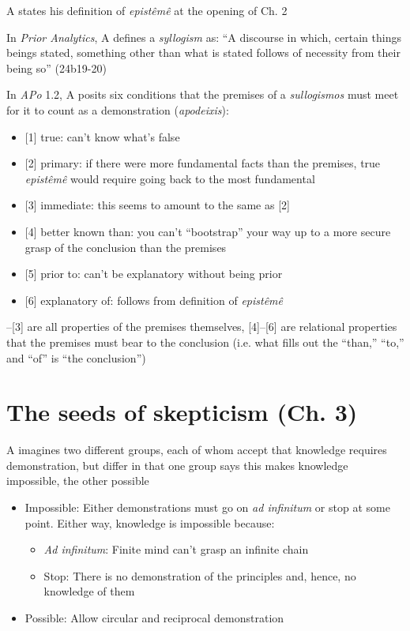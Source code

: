 \documentclass[oneside]{article}
\begin{document}
\noindent A states his definition of \emph{epist\^{e}m\^{e}} at the opening of Ch. 2
\vspace*{2mm}

\noindent In \emph{Prior Analytics}, A defines a \emph{syllogism} as: ``A discourse in which, certain things beings stated, something other than what is stated follows of necessity from their being so'' (24b19-20)
\vspace*{2mm}

\noindent In \emph{APo} 1.2, A posits six conditions that the premises of a \emph{sullogismos} must meet for it to count as a demonstration (\emph{apodeixis}):

\begin{itemize}\item{[1] true: can't know what's false}\item{[2] primary: if there were more fundamental facts than the premises, true \emph{epist\^{e}m\^{e}} would require going back to the most fundamental}\item{[3] immediate: this seems to amount to the same as [2]}\item{[4] better known than: you can't ``bootstrap'' your way up to a more secure grasp of the conclusion than the premises}\item{[5] prior to: can't be explanatory without being prior}\item{[6] explanatory of: follows from definition of \emph{epist\^{e}m\^{e}}}\end{itemize}

\noindent [1]--[3] are all properties of the premises themselves, [4]--[6] are relational properties that the premises must bear to the conclusion (i.e. what fills out the ``than,'' ``to,'' and ``of'' is ``the conclusion'')
\vspace*{2mm}

\section*{The seeds of skepticism (Ch. 3)}

\noindent A imagines two different groups, each of whom accept that knowledge requires demonstration, but differ in that one group says this makes knowledge impossible, the other possible

\begin{itemize}\item{Impossible: Either demonstrations must go on \emph{ad infinitum} or stop at some point. Either way, knowledge is impossible because:}\begin{itemize}\item{\emph{Ad infinitum}: Finite mind can't grasp an infinite chain}\item{Stop: There is no demonstration of the principles and, hence, no knowledge of them}\end{itemize}\item{Possible: Allow circular and reciprocal demonstration}\end{itemize}
\end{document}

